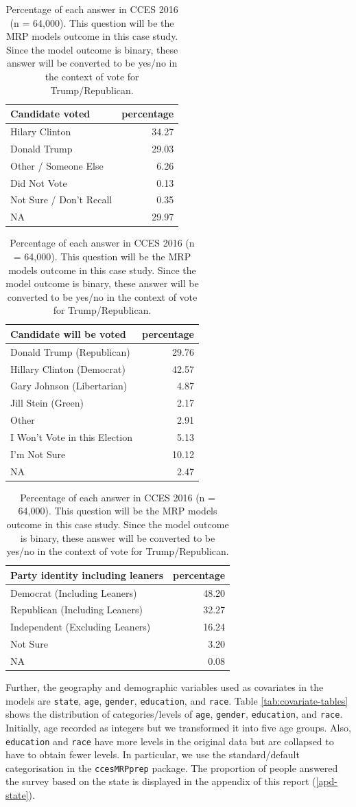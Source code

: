 \documentclass{monashthesis}
\begin{document}
\begin{table}
\caption{\label{tab:outcome-table}Percentage of each answer in CCES 2016 (n = 64,000). This question will be the MRP models outcome in this case study. Since the model outcome is binary, these answer will be converted to be yes/no in the context of vote for Trump/Republican.}

\centering
\begin{tabular}[t]{lr}
\toprule
Candidate voted & percentage\\
\midrule
Hilary Clinton & 34.27\\
Donald Trump & 29.03\\
Other / Someone Else & 6.26\\
Did Not Vote & 0.13\\
Not Sure / Don't Recall & 0.35\\
\addlinespace
NA & 29.97\\
\bottomrule
\end{tabular}
\centering
\begin{tabular}[t]{lr}
\toprule
Candidate will be voted & percentage\\
\midrule
Donald Trump (Republican) & 29.76\\
Hillary Clinton (Democrat) & 42.57\\
Gary Johnson (Libertarian) & 4.87\\
Jill Stein (Green) & 2.17\\
Other & 2.91\\
\addlinespace
I Won't Vote in this Election & 5.13\\
I'm Not Sure & 10.12\\
NA & 2.47\\
\bottomrule
\end{tabular}
\centering
\begin{tabular}[t]{lr}
\toprule
Party identity including leaners & percentage\\
\midrule
Democrat (Including Leaners) & 48.20\\
Republican (Including Leaners) & 32.27\\
Independent (Excluding Leaners) & 16.24\\
Not Sure & 3.20\\
NA & 0.08\\
\bottomrule
\end{tabular}
\end{table}

Further, the geography and demographic variables used as covariates in the models are \texttt{state}, \texttt{age}, \texttt{gender}, \texttt{education}, and \texttt{race}. Table \ref{tab:covariate-tables} shows the distribution of categories/levels of \texttt{age}, \texttt{gender}, \texttt{education}, and \texttt{race}. Initially, age recorded as integers but we transformed it into five age groups. Also, \texttt{education} and \texttt{race} have more levels in the original data but are collapsed to have to obtain fewer levels. In particular, we use the standard/default categorisation in the \texttt{ccesMRPprep} package. The proportion of people answered the survey based on the state is displayed in the appendix of this report (\ref{apd-state}).
\end{document}
